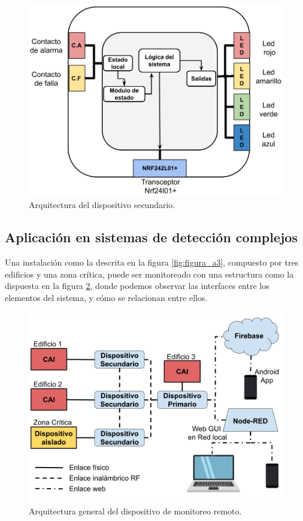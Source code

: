 \begin{figure}[]
	\centering
	\includegraphics[scale=.25]{./Figures/Capitulo3/Fig_D3.png}
	\caption{Arquitectura del dispositivo secundario.}
	\label{fig:figura_d3}
\end{figure} 

\subsection{Aplicación en sistemas de detección complejos}

Una instalación como la descrita en la figura \ref{fig:figura_a3}, compuesto por tres edificios y una zona crítica, puede ser monitoreado con una estructura como la dispuesta en la figura \ref{fig:figura_e3}, donde podemos observar las interfaces entre los elementos del sistema,  y cómo se relacionan entre ellos.

\begin{figure}[]
	\centering
	\includegraphics[scale=.25]{./Figures/Capitulo3/Fig_E3.png}
	\caption{Arquitectura general del dispositivo de monitoreo remoto.}
	\label{fig:figura_e3}
\end{figure} 

